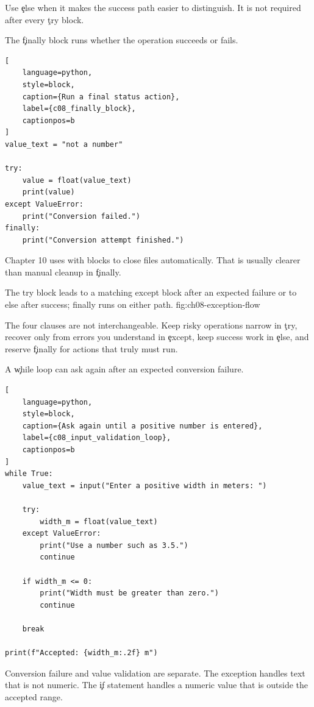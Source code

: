 Use \c{else} when it makes the success path easier to distinguish. It is not
required after every \c{try} block.


The \c{finally} block runs whether the operation succeeds or fails.

\begin{lstlisting}[
    language=python,
    style=block,
    caption={Run a final status action},
    label={c08_finally_block},
    captionpos=b
]
value_text = "not a number"

try:
    value = float(value_text)
    print(value)
except ValueError:
    print("Conversion failed.")
finally:
    print("Conversion attempt finished.")
\end{lstlisting}

Chapter 10 uses with blocks to close files automatically. That is usually
clearer than manual cleanup in \c{finally}.

{The try block leads to a matching except block after an expected failure or to else after success; finally runs on either path.}
{fig:ch08-exception-flow}

The four clauses are not interchangeable. Keep risky operations narrow in
\c{try}, recover only from errors you understand in \c{except}, keep success
work in \c{else}, and reserve \c{finally} for actions that truly must run.


A \c{while} loop can ask again after an expected conversion failure.

\begin{lstlisting}[
    language=python,
    style=block,
    caption={Ask again until a positive number is entered},
    label={c08_input_validation_loop},
    captionpos=b
]
while True:
    value_text = input("Enter a positive width in meters: ")

    try:
        width_m = float(value_text)
    except ValueError:
        print("Use a number such as 3.5.")
        continue

    if width_m <= 0:
        print("Width must be greater than zero.")
        continue

    break

print(f"Accepted: {width_m:.2f} m")
\end{lstlisting}

Conversion failure and value validation are separate. The exception handles
text that is not numeric. The \c{if} statement handles a numeric value that is
outside the accepted range.


